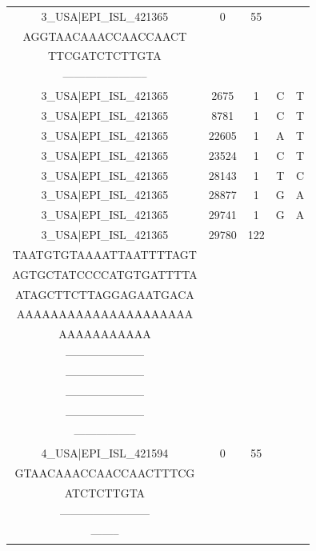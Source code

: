 \documentclass[a4paper,10pt]{article}
\begin{document}
\begin{longtable}{@{}ccccc@{}}
3\_USA|EPI\_ISL\_421365 & 0 & 55 & \begin{tabular}[c]{@{}c@{}}ATTAAAGGTTTATACCTTCCC\\ AGGTAACAAACCAACCAACT\\ TTCGATCTCTTGTA\end{tabular} & \begin{tabular}[c]{@{}c@{}}-------------------------------\\ -----------------------\end{tabular} \\* \midrule
3\_USA|EPI\_ISL\_421365 & 2675 & 1 & C & T \\* \midrule
3\_USA|EPI\_ISL\_421365 & 8781 & 1 & C & T \\* \midrule
3\_USA|EPI\_ISL\_421365 & 22605 & 1 & A & T \\* \midrule
3\_USA|EPI\_ISL\_421365 & 23524 & 1 & C & T \\* \midrule
3\_USA|EPI\_ISL\_421365 & 28143 & 1 & T & C \\* \midrule
3\_USA|EPI\_ISL\_421365 & 28877 & 1 & G & A \\* \midrule
3\_USA|EPI\_ISL\_421365 & 29741 & 1 & G & A \\* \midrule
3\_USA|EPI\_ISL\_421365 & 29780 & 122 & \begin{tabular}[c]{@{}c@{}}AGCTGCCTATATGGAAGAGCCC\\ TAATGTGTAAAATTAATTTTAGT\\ AGTGCTATCCCCATGTGATTTTA\\ ATAGCTTCTTAGGAGAATGACA\\ AAAAAAAAAAAAAAAAAAAAA\\ AAAAAAAAAAA\end{tabular} & \begin{tabular}[c]{@{}c@{}}---------------------\\ ---------------------\\ ---------------------\\ ---------------------\\ ---------------------\\ -----------------\end{tabular} \\* \midrule
4\_USA|EPI\_ISL\_421594 & 0 & 55 & \begin{tabular}[c]{@{}c@{}}ATTAAAGGTTTATACCTTCCCAG\\ GTAACAAACCAACCAACTTTCG\\ ATCTCTTGTA\end{tabular} & \begin{tabular}[c]{@{}c@{}}-----------------------\\ ------------------------\\ --------\end{tabular} \\* \midrule

\end{longtable}
\end{document}
